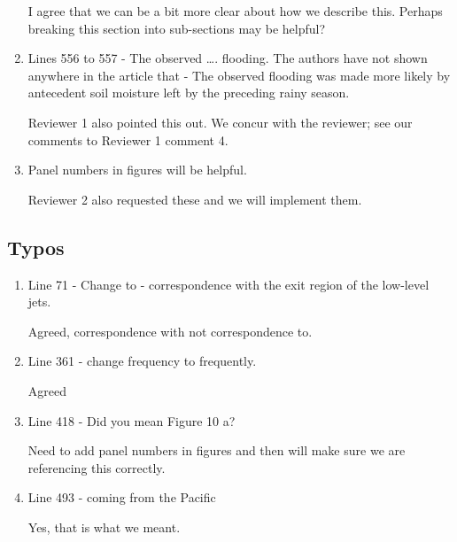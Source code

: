 \documentclass{article}
\newenvironment{answer}{\begin{mdframed}}{\end{mdframed}}
\begin{document}
\begin{enumerate}
	\begin{answer}
		I agree that we can be a bit more clear about how we describe this.
		Perhaps breaking this section into sub-sections may be helpful?
	\end{answer}
	\item Lines 556 to 557 - The observed …. flooding. The authors have not shown anywhere in the article that - The observed flooding was made more likely by antecedent soil moisture left by the preceding rainy season.
	\begin{answer}
		Reviewer 1 also pointed this out.
		We concur with the reviewer; see our comments to Reviewer 1 comment 4.
	\end{answer}
	\item Panel numbers in figures will be helpful.
	\begin{answer}
		Reviewer 2 also requested these and we will implement them.
	\end{answer}
\end{enumerate}

\subsection{Typos}
\begin{enumerate}
	\item  Line 71 - Change to - correspondence with the exit region of the low-level jets.
	\begin{answer}
		Agreed, correspondence with not correspondence to.
	\end{answer}
	\item Line 361 - change frequency to frequently.
	\begin{answer}
		Agreed
	\end{answer}
	\item Line 418 - Did you mean Figure 10 a?
	\begin{answer}
		Need to add panel numbers in figures and then will make sure we are referencing this correctly.
	\end{answer}
	\item Line 493 - coming from the Pacific
	\begin{answer}
		Yes, that is what we meant.
	\end{answer}
\end{enumerate}
\end{document}
